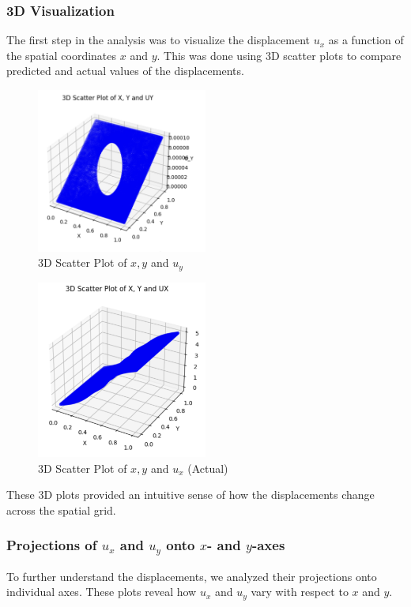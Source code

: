 \documentclass[fleqn,10pt]{olplainarticle}
\begin{document}
\subsubsection{3D Visualization}
The first step in the analysis was to visualize the displacement $u_x$ as a function of the spatial coordinates $x$ and $y$. This was done using 3D scatter plots to compare predicted and actual values of the displacements.

\begin{figure}[h!]
\centering
\includegraphics[width=0.5\textwidth]{Photo/1.png}
\caption{3D Scatter Plot of $x, y$ and $u_y$ }
\end{figure}

\begin{figure}[h!]
\centering
\includegraphics[width=0.5\textwidth]{Photo/7.png}
\caption{3D Scatter Plot of $x, y$ and $u_x$ (Actual)}
\end{figure}

These 3D plots provided an intuitive sense of how the displacements change across the spatial grid.

\subsubsection{Projections of $u_x$ and $u_y$ onto $x$- and $y$-axes}
To further understand the displacements, we analyzed their projections onto individual axes. These plots reveal how $u_x$ and $u_y$ vary with respect to $x$ and $y$.
\end{document}
